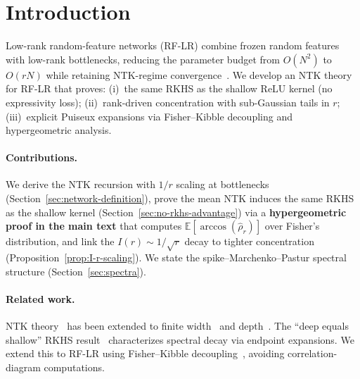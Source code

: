 \section{Introduction}\label{sec:intro}

Low-rank random-feature networks (RF-LR) combine frozen random features with low-rank bottlenecks, reducing the parameter budget from \( O(N^2) \) to \( O(rN) \) while retaining NTK-regime convergence~\cite{zhang2025structuredbalancedmulticomponentmultilayer}. We develop an NTK theory for RF-LR that proves: (i)~the same RKHS as the shallow ReLU kernel (no expressivity loss); (ii)~rank-driven concentration with sub-Gaussian tails in \( r \); (iii)~explicit Puiseux expansions via Fisher--Kibble decoupling and hypergeometric analysis.

\paragraph{Contributions.} We derive the NTK recursion with \( 1/r \) scaling at bottlenecks (Section~\ref{sec:network-definition}), prove the mean NTK induces the same RKHS as the shallow kernel (Section~\ref{sec:no-rkhs-advantage}) via a \textbf{hypergeometric proof in the main text} that computes \( \mathbb{E}[\arccos(\hat{\rho}_r)] \) over Fisher's distribution, and link the \( I(r) \sim 1/\sqrt{r} \) decay to tighter concentration (Proposition~\ref{prop:I-r-scaling}). We state the spike--Marchenko--Pastur spectral structure (Section~\ref{sec:spectra}).

\paragraph{Related work.} NTK theory~\cite{jacot2018neural} has been extended to finite width~\cite{arora2019exact} and depth~\cite{terjek2022depth}. The ``deep equals shallow'' RKHS result~\cite{bietti2021deepequalsshallowrelu} characterizes spectral decay via endpoint expansions. We extend this to RF-LR using Fisher--Kibble decoupling~\cite{fisher1915probable,hotelling1953new}, avoiding correlation-diagram computations.
